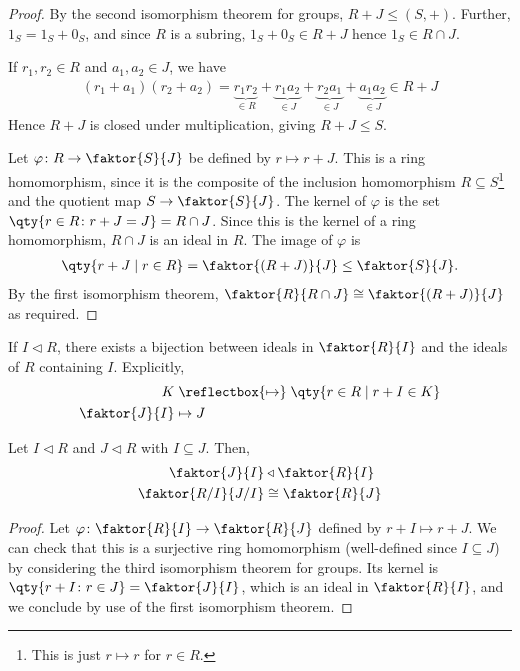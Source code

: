 \begin{proof}
	By the second isomorphism theorem for groups, $R+J \leq (S, +)$.
	Further, $1_S = 1_S + 0_S$, and since $R$ is a subring, $1_S + 0_S \in R + J$ hence $1_S \in R \cap J$.

	If $r_1, r_2 \in R$ and $a_1, a_2 \in J$, we have
	\begin{align*}
		(r_1 + a_1)(r_2 + a_2) = \underbrace{r_1 r_2}_{\in R} + \underbrace{r_1 a_2}_{\in J} + \underbrace{r_2 a_1}_{\in J} + \underbrace{a_1 a_2}_{\in J} \in R + J
	\end{align*}
	Hence $R+J$ is closed under multiplication, giving $R+J \leq S$.

	Let $\varphi \colon R \to \faktor{S}{J}$ be defined by $r \mapsto r + J$.
	This is a ring homomorphism, since it is the composite of the inclusion homomorphism $R \subseteq S$\footnote{This is just $r \mapsto r$ for $r \in R$.} and the quotient map $S \to \faktor{S}{J}$.
	The kernel of $\varphi$ is the set $\qty{r \in R \colon r+J = J} = R \cap J$.
	Since this is the kernel of a ring homomorphism, $R \cap J$ is an ideal in $R$.
	The image of $\varphi$ is \begin{align*}
		\qty{r+J \mid r \in R} = \faktor{(R+J)}{J} \leq \faktor{S}{J}.
	\end{align*}
	By the first isomorphism theorem, $\faktor{R}{R \cap J} \cong \faktor{(R+J)}{J}$ as required.
\end{proof}

\begin{remark} \label{rem:correspondence}
	If $I \triangleleft R$, there exists a bijection between ideals in $\faktor{R}{I}$ and the ideals of $R$ containing $I$.
	Explicitly,
	\begin{align*}
		K &\mathrel{\reflectbox{\ensuremath{\mapsto}}} \qty{r \in R \mid r + I \in K} \\
		\faktor{J}{I} &\mapsto J
	\end{align*}
\end{remark}

\begin{theorem}
	Let $I \triangleleft R$ and $J \triangleleft R$ with $I \subseteq J$.
	Then,
	\begin{align*}
		\faktor{J}{I} &\triangleleft \faktor{R}{I} \\ 
		\faktor{R/I}{J/I} &\cong \faktor{R}{J}
	\end{align*}
\end{theorem}

\begin{proof}
	Let $\varphi \colon \faktor{R}{I} \to \faktor{R}{J}$ defined by $r+I \mapsto r+J$.
	We can check that this is a surjective ring homomorphism (well-defined since $I \subseteq J$) by considering the third isomorphism theorem for groups.
	Its kernel is $\qty{r + I \colon r \in J} = \faktor{J}{I}$, which is an ideal in $\faktor{R}{I}$, and we conclude by use of the first isomorphism theorem.
\end{proof}

